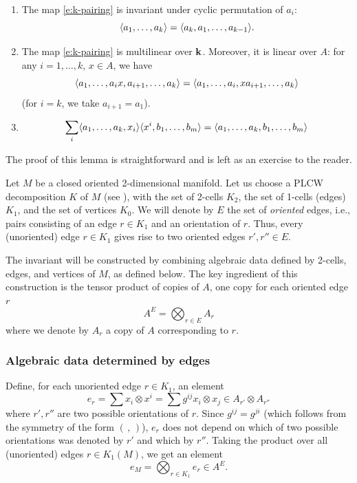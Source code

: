 \begin{lemma}\label{l:k-pairing}
  \par\noindent
  \begin{enumerate}
    \item The map \eqref{e:k-pairing} is invariant under cyclic permutation of
      $a_i$:
      $$
      \langle a_1, \dots, a_k\rangle = \langle a_k, a_1, \dots, a_{k-1}\rangle.
      $$
    \item The map \eqref{e:k-pairing} is multilinear over $\mathbf{k}$. Moreover, it is
      linear over $A$: for any $i=1,\dots, k$, $x\in A$, we have
      $$
        \langle a_1, \dots, a_ix, a_{i+1},\dots, a_k\rangle =
        \langle a_1, \dots, a_i, xa_{i+1},\dots, a_k\rangle
      $$
      \textup{(}for $i=k$, we take $a_{i+1}=a_1$\textup{)}.
    \item
      \begin{equation}\label{e:k-pairing-2}
        \sum_i \langle a_1, \dots, a_k, x_i\rangle \langle x^i, b_1, \dots, b_m\rangle
         =\langle a_1, \dots, a_k, b_1, \dots, b_m\rangle
      \end{equation}
  \end{enumerate}
\end{lemma}
The proof of this lemma is straightforward and is left as an exercise to
the reader.

Let $M$ be a closed oriented 2-dimensional manifold. Let us choose a PLCW
decomposition $K$ of $M$ (see ), with the set of 2-cells $K_2$,
the set of 1-cells (edges) $K_1$, and the set of vertices $K_0$. We will denote
by $E$ the set of \emph{oriented} edges, i.e., pairs consisting of an edge $r\in
K_1$ and an orientation of $r$. Thus, every (unoriented) edge $r\in K_1$ gives
rise to two oriented edges $r', r''\in E$.

The invariant will be constructed by combining algebraic data defined by
2-cells, edges, and vertices of $M$, as defined below. The key ingredient of
this construction is the tensor product of copies of $A$, one copy for
each oriented edge $r$
\begin{equation}\label{e:AE}
  A^E = \bigotimes_{r\in E}A_r
\end{equation}
where we denote by $A_r$ a copy of $A$ corresponding
to $r$.

\subsubsection*{\textbf{Algebraic data determined by edges}}
Define, for each unoriented edge $r\in K_1$, an element
\begin{equation}\label{e:er}
 e_r = \sum x_i\otimes x^i
     =\sum g^{ij} x_i \otimes x_j\in A_{r'}\otimes A_{r''}
\end{equation}
where $r', r''$ are two possible orientations of $r$. Since $g^{ij}=g^{ji}$
(which follows from the symmetry of the form $(\, , \,)$), $e_r$ does not
depend on which of two possible orientations was denoted by $r'$ and which
by $r''$. Taking the product over all (unoriented) edges $r\in K_1(M)$, we
get an element
\begin{equation}\label{e:eM}
  e_M = \bigotimes_{r\in K_1} e_r\in A^E.
\end{equation}

